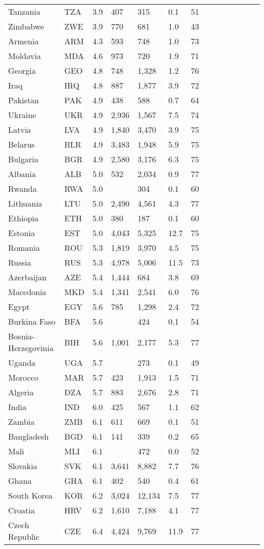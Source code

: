 \begin{scriptsize}
\begin{center}
\begin{longtable}{llllllllllllll}
Tanzania&TZA&3.9&407&315&0.1&51\\
Zimbabwe&ZWE&3.9&770&681&1.0&43\\
Armenia&ARM&4.3&593&748&1.0&73\\
Moldavia&MDA&4.6&973&720&1.9&71\\
Georgia&GEO&4.8&748&1,328&1.2&76\\
Iraq&IRQ&4.8&887&1,877&3.9&72\\
Pakistan&PAK&4.9&438&588&0.7&64\\
Ukraine&UKR&4.9&2,936&1,567&7.5&74\\
Latvia&LVA&4.9&1,840&3,470&3.9&75\\
Belarus&BLR&4.9&3,483&1,948&5.9&75\\
Bulgaria&BGR&4.9&2,580&3,176&6.3&75\\
Albania&ALB&5.0&532&2,034&0.9&77\\
Rwanda&RWA&5.0&&304&0.1&60\\
Lithuania&LTU&5.0&2,490&4,561&4.3&77\\
Ethiopia&ETH&5.0&380&187&0.1&60\\
Estonia&EST&5.0&4,043&5,325&12.7&75\\
Romania&ROU&5.3&1,819&3,970&4.5&75\\
Russia&RUS&5.3&4,978&5,006&11.5&73\\
Azerbaijan&AZE&5.4&1,444&684&3.8&69\\
Macedonia&MKD&5.4&1,341&2,541&6.0&76\\
Egypt&EGY&5.6&785&1,298&2.4&72\\
Burkina Faso&BFA&5.6&&424&0.1&54\\
Bosnia-Herzegovinia&BIH&5.6&1,001&2,177&5.3&77\\
Uganda&UGA&5.7&&273&0.1&49\\
Morocco&MAR&5.7&423&1,913&1.5&71\\
Algeria&DZA&5.7&883&2,676&2.8&71\\
India&IND&6.0&425&567&1.1&62\\
Zambia&ZMB&6.1&611&669&0.1&51\\
Bangladesh&BGD&6.1&141&339&0.2&65\\
Mali&MLI&6.1&&472&0.0&52\\
Slovakia&SVK&6.1&3,641&8,882&7.7&76\\
Ghana&GHA&6.1&402&540&0.4&61\\
South Korea&KOR&6.2&3,024&12,134&7.5&77\\
Croatia&HRV&6.2&1,610&7,188&4.1&77\\
Czech Republic&CZE&6.4&4,424&9,769&11.9&77\\

\end{longtable}
\end{center}
\end{scriptsize}
